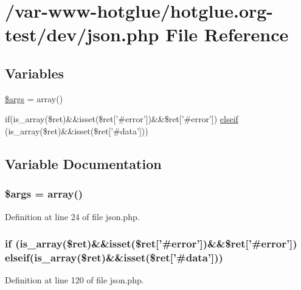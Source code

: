 \hypertarget{json_8php}{
\section{/var-\/www-\/hotglue/hotglue.org-\/test/dev/json.php File Reference}
\label{json_8php}
}
\subsection*{Variables}
\begin{DoxyCompactItemize}
\item 
\hyperlink{json_8php_a67e94494731d99ed23b123e95175bc10}{\$args} = array()
\item 
if(is\_\-array(\$ret)\&\&isset(\$ret\mbox{[}'\#error'\mbox{]})\&\&\$ret\mbox{[}'\#error'\mbox{]}) \hyperlink{json_8php_affd32ec1771cd364116738727d3a1ed8}{elseif} (is\_\-array(\$ret)\&\&isset(\$ret\mbox{[}'\#data'\mbox{]}))
\end{DoxyCompactItemize}


\subsection{Variable Documentation}
\hypertarget{json_8php_a67e94494731d99ed23b123e95175bc10}{
\subsubsection[{\$args}]{\setlength{\rightskip}{0pt plus 5cm}\$args = array()}}
\label{json_8php_a67e94494731d99ed23b123e95175bc10}


Definition at line 24 of file json.php.

\hypertarget{json_8php_affd32ec1771cd364116738727d3a1ed8}{
\subsubsection[{elseif}]{\setlength{\rightskip}{0pt plus 5cm}if (is\_\-array(\$ret)\&\&isset(\$ret\mbox{[}'\#error'\mbox{]})\&\&\$ret\mbox{[}'\#error'\mbox{]}) {\bf elseif}(is\_\-array(\$ret)\&\&isset(\$ret\mbox{[}'\#data'\mbox{]}))}}
\label{json_8php_affd32ec1771cd364116738727d3a1ed8}


Definition at line 120 of file json.php.

